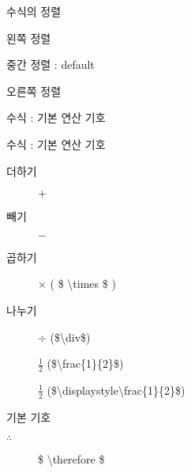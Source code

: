 \documentclass[ aspectratio=149,  14pt,blue,xcolor=pdftex,dvipsnames,table,handout,notes]{beamer}
\begin{document}
		\begin{frame}[t]{수식의 정렬}

			\begin{block} {왼쪽 정렬}
			\end{block}

			\begin{block} {중간 정렬 : default}
			\end{block}

			\begin{block} {오른쪽 정렬}
			\end{block}

		
		\end{frame}





		\begin{frame}[t]{수식 : 기본 연산 기호}

			\begin{block} {수식 : 기본 연산 기호}
			\begin{description}
			\item[더하기] 	$+$
			\item[빼기] 	$-$
			\item[곱하기] 	$\times$ ( \$ \textbackslash times \$ )
			\item[나누기] 	$\div$ (\$\textbackslash div\$)
			\item[] 		$\frac{1}{2}$ (\$\textbackslash frac\{1\}\{2\}\$)
			\item[] 		$\displaystyle\frac{1}{2}$
						(\$\textbackslash displaystyle\textbackslash frac\{1\}\{2\}\$)
			\end{description}
			\end{block}
	
			\begin{block} {기본 기호}
			\begin{description}
			\item[$\therefore$] 	\$ \textbackslash therefore \$
			\end{description}
			\end{block}

		
		\end{frame}
\end{document}
